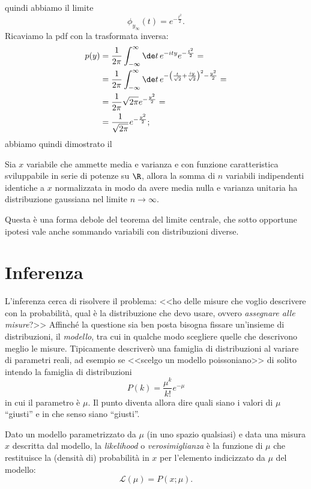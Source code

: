 quindi abbiamo il limite
\begin{equation*}
	\phi_{y_\infty}(t) = e^{-\frac{t^2}2}.
\end{equation*}
Ricaviamo la pdf con la trasformata inversa:
\begin{align*}
	p(y)
	&= \frac1{2\pi} \int_{-\infty}^\infty \de t\, e^{-ity} e^{-\frac{t^2}2} = \\
	&= \frac1{2\pi} \int_{-\infty}^\infty \de t\,
	e^{-\left(\frac t{\sqrt 2} + \frac{iy}{\sqrt 2}\right)^2 - \frac{y^2}2} = \\
	&= \frac1{2\pi} \sqrt{2\pi} e^{-\frac{y^2}2} = \\
	&= \frac1{\sqrt{2\pi}} e^{-\frac{y^2}2};
\end{align*}
abbiamo quindi dimostrato il
\begin{theorem}
	\label{th:limitecentrale}
	Sia $x$ variabile che ammette media e varianza e con funzione caratteristica sviluppabile in serie di potenze su $\R$,
	allora la somma di $n$ variabili indipendenti identiche a $x$ normalizzata in modo da avere media nulla e varianza unitaria ha distribuzione gaussiana nel limite $n\to\infty$.
\end{theorem}
Questa è una forma debole del teorema del limite centrale, che sotto opportune ipotesi vale anche sommando variabili con distribuzioni diverse.

\chapter{Inferenza}

L'inferenza cerca di risolvere il problema:
<<ho delle misure che voglio descrivere con la probabilità,
qual è la distribuzione che devo usare, ovvero \emph{assegnare alle misure}?>>
Affinché la questione sia ben posta bisogna fissare un'insieme di distribuzioni, il \emph{modello},
tra cui in qualche modo scegliere quelle che descrivono meglio le misure.
Tipicamente descriverò una famiglia di distribuzioni al variare di parametri reali,
ad esempio se <<scelgo un modello poissoniano>> di solito intendo la famiglia di distribuzioni
\begin{equation*}
	P(k) = \frac{\mu^k}{k!}e^{-\mu}
\end{equation*}
in cui il parametro è $\mu$.
Il punto diventa allora dire quali siano i valori di $\mu$ ``giusti'' e in che senso siano ``giusti''.

\begin{definition}[Likelihood]
	Dato un modello parametrizzato da $\mu$ (in uno spazio qualsiasi)
	e data una misura $x$ descritta dal modello,
	la \emph{likelihood} o \emph{verosimiglianza} è la funzione di $\mu$
	che restituisce la (densità di) probabilità in $x$ per l'elemento indicizzato da $\mu$ del modello:
	\begin{equation*}
		\mathcal L(\mu) = P(x;\mu).
	\end{equation*}
\end{definition}

